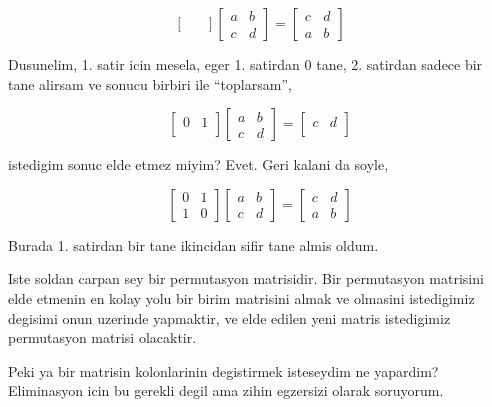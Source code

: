\documentclass[12pt,fleqn]{article}\usepackage{../common}
\begin{document}
$$ 
\left[\begin{array}{rr}
 &  \\
 & 
\end{array}\right]
\left[\begin{array}{rr}
a & b \\
c & d
\end{array}\right]
=
\left[\begin{array}{rr}
c & d \\
a & b 
\end{array}\right]
 $$

Dusunelim, 1. satir icin mesela, eger 1. satirdan 0 tane, 2. satirdan
sadece bir tane alirsam ve sonucu birbiri ile ``toplarsam'', 

$$ 
\left[\begin{array}{rr}
0 & 1 \\
 & 
\end{array}\right]
\left[\begin{array}{rr}
a & b \\
c & d
\end{array}\right]
=
\left[\begin{array}{rr}
c & d \\
 & 
\end{array}\right]
 $$

istedigim sonuc elde etmez miyim? Evet. Geri kalani da soyle,

$$ 
\left[\begin{array}{rr}
0 & 1 \\
1 & 0
\end{array}\right]
\left[\begin{array}{rr}
a & b \\
c & d
\end{array}\right]
=
\left[\begin{array}{rr}
c & d \\
a & b
\end{array}\right]
 $$

Burada 1. satirdan bir tane ikincidan sifir tane almis oldum.

Iste soldan carpan sey bir permutasyon matrisidir. Bir permutasyon
matrisini elde etmenin en kolay yolu bir birim matrisini almak ve olmasini
istedigimiz degisimi onun uzerinde yapmaktir, ve elde edilen yeni matris
istedigimiz permutasyon matrisi olacaktir. 

Peki ya bir matrisin kolonlarinin degistirmek isteseydim ne yapardim?
Eliminasyon icin bu gerekli degil ama zihin egzersizi olarak
soruyorum. 
\end{document}
